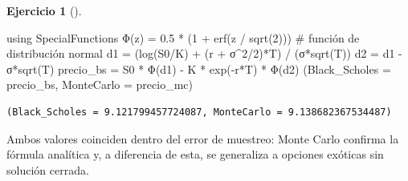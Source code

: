 \documentclass[
  spanish,
  a4paper,
]{scrreport}
\newenvironment{Shaded}{\begin{snugshade}}{\end{snugshade}}
\newcommand{\BuiltInTok}[1]{\textcolor[rgb]{0.00,0.23,0.31}{#1}}
\newcommand{\CommentTok}[1]{\textcolor[rgb]{0.37,0.37,0.37}{#1}}
\newcommand{\FloatTok}[1]{\textcolor[rgb]{0.68,0.00,0.00}{#1}}
\newcommand{\FunctionTok}[1]{\textcolor[rgb]{0.28,0.35,0.67}{#1}}
\newcommand{\ImportTok}[1]{\textcolor[rgb]{0.00,0.46,0.62}{#1}}
\newcommand{\NormalTok}[1]{\textcolor[rgb]{0.00,0.23,0.31}{#1}}
\newcommand{\OperatorTok}[1]{\textcolor[rgb]{0.37,0.37,0.37}{#1}}
\theoremstyle{definition}
\newtheorem{exercise}{Ejercicio}[chapter]
\theoremstyle{remark}
\begin{document}
\begin{exercise}[]
\begin{enumerate}
\begin{tcolorbox}
\begin{Shaded}
\begin{Highlighting}[]
\ImportTok{using} \BuiltInTok{SpecialFunctions}
\FunctionTok{Φ}\NormalTok{(z) }\OperatorTok{=} \FloatTok{0.5} \OperatorTok{*}\NormalTok{ (}\FloatTok{1} \OperatorTok{+} \FunctionTok{erf}\NormalTok{(z }\OperatorTok{/} \FunctionTok{sqrt}\NormalTok{(}\FloatTok{2}\NormalTok{)))     }\CommentTok{\# función de distribución normal}
\NormalTok{d1 }\OperatorTok{=}\NormalTok{ (}\FunctionTok{log}\NormalTok{(S0}\OperatorTok{/}\NormalTok{K) }\OperatorTok{+}\NormalTok{ (r }\OperatorTok{+}\NormalTok{ σ}\OperatorTok{\^{}}\FloatTok{2}\OperatorTok{/}\FloatTok{2}\NormalTok{)}\OperatorTok{*}\NormalTok{T) }\OperatorTok{/}\NormalTok{ (}\FunctionTok{σ*sqrt}\NormalTok{(T))}
\NormalTok{d2 }\OperatorTok{=}\NormalTok{ d1 }\OperatorTok{{-}} \FunctionTok{σ*sqrt}\NormalTok{(T)}
\NormalTok{precio\_bs }\OperatorTok{=}\NormalTok{ S0 }\OperatorTok{*} \FunctionTok{Φ}\NormalTok{(d1) }\OperatorTok{{-}}\NormalTok{ K }\OperatorTok{*} \FunctionTok{exp}\NormalTok{(}\OperatorTok{{-}}\NormalTok{r}\OperatorTok{*}\NormalTok{T) }\OperatorTok{*} \FunctionTok{Φ}\NormalTok{(d2)}
\NormalTok{(Black\_Scholes }\OperatorTok{=}\NormalTok{ precio\_bs, MonteCarlo }\OperatorTok{=}\NormalTok{ precio\_mc)}
\end{Highlighting}
\end{Shaded}

\begin{verbatim}
(Black_Scholes = 9.121799457724087, MonteCarlo = 9.138682367534487)
\end{verbatim}

  Ambos valores coinciden dentro del error de muestreo: Monte Carlo
  confirma la fórmula analítica y, a diferencia de esta, se generaliza a
  opciones exóticas sin solución cerrada.

  \end{tcolorbox}
\end{enumerate}

\end{exercise}
\end{document}
